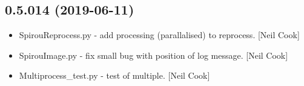 \documentclass[a4paper,10pt,english]{report}
\begin{document}
\subsection{0.5.014 (2019-06-11)}
\label{\detokenize{misc/changelog:id121}}\begin{itemize}
\item {} 
SpirouReprocess.py - add processing (parallalised) to reprocess. {[}Neil
Cook{]}

\item {} 
SpirouImage.py - fix small bug with position of log message. {[}Neil
Cook{]}

\item {} 
Multiprocess\_test.py - test of multiple. {[}Neil Cook{]}

\end{itemize}
\end{document}
